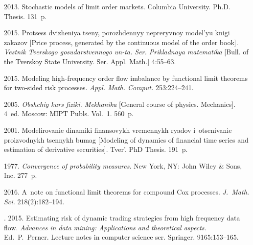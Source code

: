   \begin{multicols}{2}

\renewcommand{\bibname}{\protect\rmfamily References}

{\small\frenchspacing
 {%
 \begin{thebibliography}{9}

 2013. Stochastic models of limit order markets. 
Columbia University. Ph.D. Thesis.  131~p.

 2015. Protsess dvizheniya tseny, 
porozhdennyy nepreryvnoy model'yu knigi zakazov 
[Price process, generated by the continuous model of the order book]. 
\textit{Vestnik Tverskogo gosudarstvennogo un-ta. Ser. 
Prikladnaya matematika} [Bull. of the Tverskoy State University. Ser. 
Appl. Math.] 4:55--63.

2015. Modeling high-frequency order flow imbalance by functional limit theorems
 for two-sided risk processes. \textit{Appl. Math. Comput.} 253:224--241.

 2005. 
\textit{Obshchiy kurs fiziki. Mekhanika}
[General course of physics. Mechanics].
4~ed. Moscow: MIPT Publs. Vol.~1.  560~p. 

 2001. Modelirovanie dinamiki finansovykh vremennykh ryadov
 i~otsenivanie proizvodnykh tsennykh bumag [Modeling of dynamics of financial time series and 
 estimation of derivative securities].  
 Tver'. PhD Thesis. 191~p.

 1977. 
\textit{Convergence of probability measures}. New York, NY: John Wiley \& Sons, Inc. 
277~p.

 2016. 
A~note on functional limit theorems for compound Cox processes. 
\textit{J.~Math. Sci.} 218(2):182--194. 

. 
2015. Estimating risk of dynamic trading strategies from high frequency data flow.
\textit{Advances in data mining: Applications and theoretical aspects.} 
Ed.\ P.~Perner.  Lecture notes in computer science ser.  
Springer. 9165:153--165.
\end{thebibliography}

 }
 }

\end{multicols}

